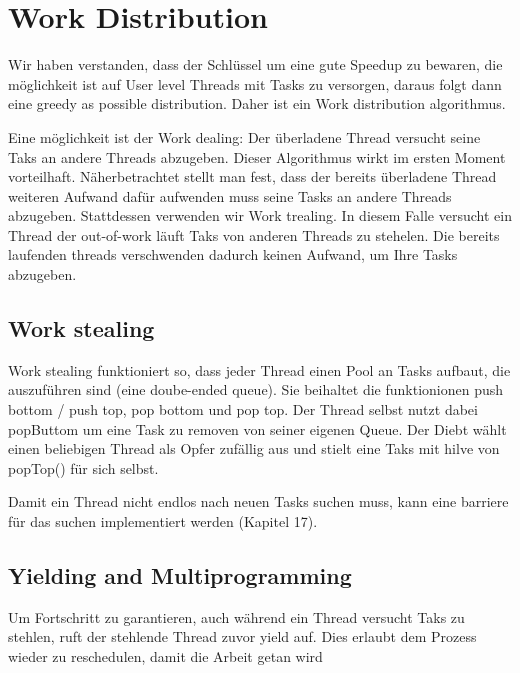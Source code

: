 \section{Work Distribution}

Wir haben verstanden, dass der Schlüssel um eine gute Speedup zu bewaren, die möglichkeit ist auf User level Threads mit Tasks zu versorgen, daraus folgt dann eine greedy as possible distribution. Daher ist ein Work distribution algorithmus.

Eine möglichkeit ist der Work dealing: Der überladene Thread versucht seine Taks an andere Threads abzugeben. Dieser Algorithmus wirkt im ersten Moment vorteilhaft. Näherbetrachtet stellt man fest, dass der bereits überladene Thread weiteren Aufwand dafür aufwenden muss seine Tasks an andere Threads abzugeben. Stattdessen verwenden wir Work trealing. In diesem Falle versucht ein Thread der out-of-work läuft Taks von anderen Threads zu stehelen. Die bereits laufenden threads verschwenden dadurch keinen Aufwand, um Ihre Tasks abzugeben.

\subsection{Work stealing}

Work stealing funktioniert so, dass jeder Thread einen Pool an Tasks aufbaut, die auszuführen sind (eine doube-ended queue). Sie beihaltet die funktionionen push bottom / push top, pop bottom und pop top. Der Thread selbst nutzt dabei popButtom um eine Task zu removen von seiner eigenen Queue. Der Diebt wählt einen beliebigen Thread als Opfer zufällig aus und stielt eine Taks mit hilve von popTop() für sich selbst. 

Damit ein Thread nicht endlos nach neuen Tasks suchen muss, kann eine barriere für das suchen implementiert werden (Kapitel 17).

\subsection{Yielding and Multiprogramming}

Um Fortschritt zu garantieren, auch während ein Thread versucht Taks zu stehlen, ruft der stehlende Thread zuvor yield auf. Dies erlaubt dem Prozess wieder zu reschedulen, damit die Arbeit getan wird


